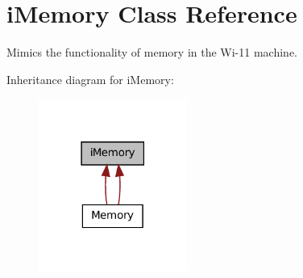 \hypertarget{classiMemory}{
\section{iMemory Class Reference}
\label{classiMemory}
}


Mimics the functionality of memory in the Wi-\/11 machine.  




Inheritance diagram for iMemory:\nopagebreak
\begin{figure}[H]
\begin{center}
\leavevmode
\includegraphics[width=138pt]{classiMemory__inherit__graph}
\end{center}
\end{figure}

